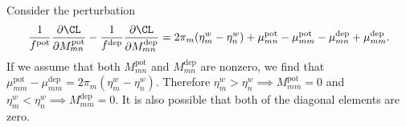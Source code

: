 \documentclass[12pt]{article}
\newcommand{\eqm}{\pi}
\newcommand{\etwm}{\eta^w}
\newcommand{\MMdm}{M}
\newcommand{\pot}{^{\text{pot}}}
\newcommand{\dep}{^{\text{dep}}}
\renewcommand{\pdiff}[2]{\frac{\partial #1}{\partial #2}}
\begin{document}
Consider the perturbation
%
\begin{equation}\label{eq:pertK}
  \frac{1}{f\pot} \pdiff{\CL}{\MMdm\pot_{mn}} -
  \frac{1}{f\dep} \pdiff{\CL}{\MMdm\dep_{mn}} =
    2 \eqm_m (\etwm_m - \etwm_n) 
    + \mu\pot_{mn} - \mu\pot_{mm} - \mu\dep_{mn} + \mu\dep_{mm}.
\end{equation}
%
If we assume that both \( \MMdm\pot_{mn} \) and \( \MMdm\dep_{mn} \) are nonzero, we find that \( \mu\pot_{mm} - \mu\dep_{mm} = 2 \eqm_m (\etwm_m - \etwm_n) \).
Therefore \( \etwm_m > \etwm_n \implies \MMdm\pot_{mm} = 0 \) and \( \etwm_m < \etwm_n \implies \MMdm\dep_{mm} = 0 \).
It is also possible that both of the diagonal elements are zero.


\begin{figure}[ht]
\begin{center}
\begin{myenuma}
  \item \label{fig:triangle_pert} 
  \item \label{fig:triangle_left} 
  \item \label{fig:triangle_right} 
  \\[1em]
  \item \label{fig:triangle_allowed} 

\end{myenuma}
\end{center}
\end{figure}
\end{document}
